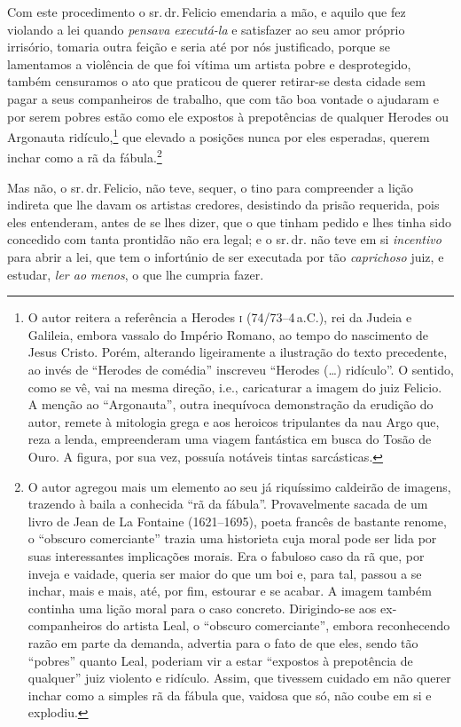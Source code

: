 Com este procedimento o sr.\,dr.\,Felicio emendaria a mão, e aquilo que
fez violando a lei quando \emph{pensava executá-la} e satisfazer ao seu
amor próprio irrisório, tomaria outra feição e seria até por nós
justificado, porque se lamentamos a violência de que foi vítima um
artista pobre e desprotegido, também censuramos o ato que praticou de
querer retirar-se desta cidade sem pagar a seus companheiros de
trabalho, que com tão boa vontade o ajudaram e por serem pobres estão
como ele expostos à prepotências de qualquer Herodes ou Argonauta
ridículo,\footnote{ O autor reitera a referência a Herodes \textsc{i} (74/73--4\,a.C.), 
rei da Judeia e Galileia, embora vassalo do Império
  Romano, ao tempo do nascimento de Jesus Cristo. Porém, alterando
  ligeiramente a ilustração do texto precedente, ao invés de ``Herodes de
  comédia'' inscreveu ``Herodes (\ldots{}) ridículo''. O sentido, como se vê,
  vai na mesma direção, i.e., caricaturar a imagem do juiz Felicio. A
  menção ao ``Argonauta'', outra inequívoca demonstração da erudição do
  autor, remete à mitologia grega e aos heroicos tripulantes da nau Argo
  que, reza a lenda, empreenderam uma viagem fantástica em busca do
  Tosão de Ouro. A figura, por sua vez, possuía notáveis tintas
  sarcásticas.} que elevado a posições nunca por eles esperadas, querem
inchar como a rã da fábula.\footnote{ O autor agregou mais um elemento
  ao seu já riquíssimo caldeirão de imagens, trazendo à baila a
  conhecida ``rã da fábula''. Provavelmente sacada de um livro de Jean de
  La Fontaine (1621--1695), poeta francês de bastante renome, o ``obscuro
  comerciante'' trazia uma historieta cuja moral pode ser lida por suas
  interessantes implicações morais. Era o fabuloso caso da rã que, por
  inveja e vaidade, queria ser maior do que um boi e, para tal, passou a
  se inchar, mais e mais, até, por fim, estourar e se acabar. A imagem
  também continha uma lição moral para o caso concreto. Dirigindo-se aos
  ex-companheiros do artista Leal, o ``obscuro comerciante'', embora
  reconhecendo razão em parte da demanda, advertia para o fato de que
  eles, sendo tão ``pobres'' quanto Leal, poderiam vir a estar ``expostos à
  prepotência de qualquer'' juiz violento e ridículo. Assim, que tivessem
  cuidado em não querer inchar como a simples rã da fábula que, vaidosa
  que só, não coube em si e explodiu.}

Mas não, o sr.\,dr.\,Felicio, não teve, sequer, o tino para compreender a
lição indireta que lhe davam os artistas credores, desistindo da prisão
requerida, pois eles entenderam, antes de se lhes dizer, que o que
tinham pedido e lhes tinha sido concedido com tanta prontidão não era
legal; e o sr.\,dr. não teve em si \emph{incentivo} para abrir a lei, que
tem o infortúnio de ser executada por tão \emph{caprichoso} juiz, e
estudar, \emph{ler ao menos}, o que lhe cumpria fazer.

